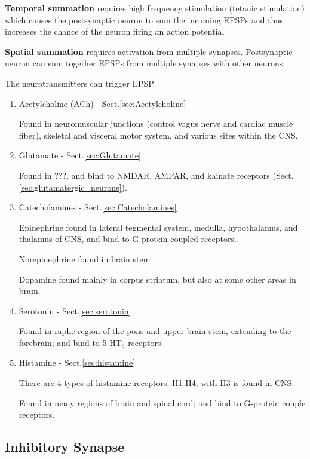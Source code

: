 {\bf Temporal summation} requires high frequency stimulation (tetanic
stimulation) which causes the postsynaptic neuron to sum the incoming EPSPs and
thus increases the chance of the neuron firing an action potential

{\bf Spatial summation} requires activation from multiple synapses. Postsynaptic
neuron can sum together EPSPs from multiple synapses with other neurons.

The neurotransmitters can trigger EPSP
\begin{enumerate}
  \item Acetylcholine (ACh) - Sect.\ref{sec:Acetylcholine}
  
  Found in neuromuscular junctions (control vagus nerve and cardiac muscle
  fiber), skeletal and visceral motor system, and various sites within the CNS. 
  
  \item Glutamate - Sect.\ref{sec:Glutamate}
  
  Found in ???, and bind to NMDAR, AMPAR, and kainate receptors
  (Sect.\ref{sec:glutamatergic_neurons}).
  
  \item Catecholamines - Sect.\ref{sec:Catecholamines}
  
  Epinephrine found in lateral tegmental system, medulla, hypothalamus, and
  thalamus of CNS, and bind to G-protein coupled receptors.
  
  Norepinephrine found in brain stem
  
  Dopamine found mainly in corpus striatum, but also at some other areas in
  brain.
  
  \item Serotonin - Sect.\ref{sec:serotonin}
  
  Found in raphe region of the pons and upper brain stem, extending to the
  forebrain; and bind to 5-HT$_3$ receptors. 
  
  \item Histamine - Sect.\ref{sec:histamine}
  
  There are 4 types of histamine receptors: H1-H4; with H3 is found in CNS.
  
  Found in many regions of brain and spinal cord; and bind to G-protein couple
  receptors.
\end{enumerate}

\subsection{Inhibitory Synapse}
\label{sec:inhibitory-synapse}


